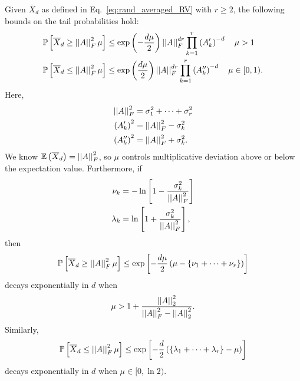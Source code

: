 \begin{thm}\label{thm:prob_err_bound}
Given $\overline{X}_{d}$ as defined in Eq.~\eqref{eq:rand_averaged_RV}
with $r\ge2$, the following bounds on the tail probabilities hold:
%
\begin{align}
    \mathbb{P}\left[ \overline{X}_{d}\ge \left| \left| A \right| \right|_{F}^{2}\mu \right]
        &\le \exp\left( -\frac{d\mu}{2} \right) \left| \left| A \right| \right|_{F}^{dr}
        \prod_{k=1}^{r}\left( A_{k}' \right)^{-d}
        \quad \mu>1 \nonumber\\
    \mathbb{P}\left[ \overline{X}_{d}\le \left| \left| A \right| \right|_{F}^{2}\mu \right]
    &\le \exp\left( \frac{d\mu}{2} \right) \left| \left| A \right| \right|_{F}^{dr}
        \prod_{k=1}^{r}\left( A_{k}'' \right)^{-d}
        \quad \mu\in[0,1).
\end{align}
%
Here,
%
\begin{align}
    \left| \left| A \right| \right|_{F}^{2} &= \sigma_{1}^{2} + \cdots + \sigma_{r}^{2} \nonumber\\
    \left( A_{k}' \right)^{2} &= \left| \left| A \right| \right|_{F}^{2} - \sigma_{k}^{2} \nonumber\\
    \left( A_{k}'' \right)^{2} &= \left| \left| A \right| \right|_{F}^{2} + \sigma_{k}^{2}.
    \label{eq:rand_As_def}
\end{align}
%
We know $\mathbb{E}\left( \overline{X}_{d} \right) = \left| \left| A \right| \right|_{F}^{2}$, so $\mu$
controls multiplicative deviation above or below the expectation value.
Furthermore, if
%
\begin{align}
    \nu_{k} &= -\ln\left[ 1-\frac{\sigma_{k}^{2}}{\left| \left| A \right| \right|_{F}^{2}} \right]
        \nonumber\\
    \lambda_{k} &= \ln\left[ 1+\frac{\sigma_{k}^{2}}{\left| \left| A \right| \right|_{F}^{2}} \right],
\end{align}
%
then
%
\begin{equation}
    \mathbb{P}\left[ \overline{X}_{d}\ge \left| \left| A \right| \right|_{F}^{2}\mu \right]
        \le \exp\left[ -\frac{d\mu}{2}\left( 
            \mu-\left\{ \nu_{1}+\cdots+\nu_{r} \right\} \right) \right]
\end{equation}
%
decays exponentially in $d$ when
%
\begin{equation}
    \mu > 1 + \frac{\left| \left| A \right| \right|_{2}^{2}}{\left| \left| A \right| \right|_{F}^{2} - \left| \left| A \right| \right|_{2}^{2}}.
\end{equation}
%
Similarly,
\begin{equation}
    \mathbb{P}\left[ \overline{X}_{d}\le \left| \left| A \right| \right|_{F}^{2}\mu \right]
        \le \exp\left[ -\frac{d}{2}\left( 
            \left\{ \lambda_{1}+\cdots+\lambda_{r} \right\}-\mu \right) \right]
\end{equation}
%
decays exponentially in $d$ when $\mu\in[0,\ln2)$.
\end{thm}

